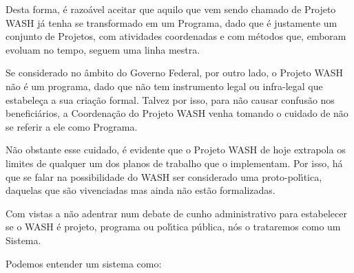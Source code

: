 \documentclass[
12pt,		%
openright,	%
twoside,  %
a4paper,			%
chapter=TITLE,		%
english,			%
french,				%
spanish,			%
brazil				%
]{USPSC-classe/USPSC}
\begin{document}
Desta forma, \'e razo\'avel aceitar que aquilo que vem sendo chamado de Projeto WASH j\'a tenha se transformado em um Programa, dado que \'e justamente um conjunto de Projetos, com atividades coordenadas e com m\'etodos que, emboram evoluam no tempo, seguem uma linha mestra.














Se considerado no \^ambito do Governo Federal, por outro lado, o Projeto WASH n\~ao \'e um programa, dado que n\~ao tem instrumento legal ou infra-legal que estabele\c{c}a a sua cria\c{c}\~ao formal. Talvez por isso, para n\~ao causar confus\~ao nos benefici\'arios, a Coordena\c{c}\~ao do Projeto WASH venha tomando o cuidado de n\~ao se referir a ele como Programa.














N\~ao obstante esse cuidado, \'e evidente que o Projeto WASH de hoje extrapola os limites de qualquer um dos planos de trabalho que o implementam. Por isso, h\'a que se falar na possibilidade do WASH ser considerado uma proto-pol\'{\i}tica, daquelas que s\~ao vivenciadas mas ainda n\~ao est\~ao formalizadas.














Com vistas a n\~ao adentrar num debate de cunho administrativo para estabelecer se o WASH \'e projeto, programa ou pol\'{\i}tica p\'ublica, n\'os o trataremos como um Sistema.














Podemos entender um sistema como:
\end{document}
